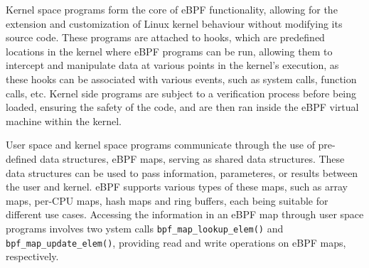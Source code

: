 Kernel space programs form the core of eBPF functionality, allowing for the extension and customization of Linux kernel behaviour without modifying its source code. These programs are attached to hooks, which are predefined locations in the kernel where eBPF programs can be run, allowing them to intercept and manipulate data at various points in the kernel's execution, as these hooks can be associated with various events, such as system calls, function calls, etc. Kernel side programs are subject to a verification process before being loaded, ensuring the safety of the code, and are then ran inside the eBPF virtual machine within the kernel. 

User space and kernel space programs communicate through the use of pre-defined data structures, eBPF maps, serving as shared data structures. These data structures can be used to pass information, parameteres, or results between the user and kernel. eBPF supports various types of these maps, such as array maps, per-CPU maps, hash maps and ring buffers, each being suitable for different use cases. Accessing the information in an eBPF map through user space programs involves two ystem calls \texttt{bpf\_map\_lookup\_elem()} and \texttt{bpf\_map\_update\_elem()}, providing read and write operations on eBPF maps, respectively.

